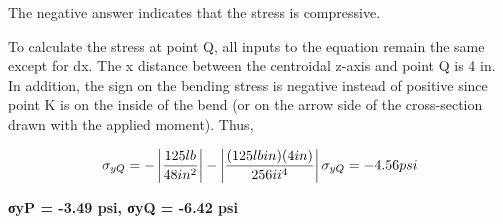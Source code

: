 \documentclass[
  letterpaper,
  DIV=11,
  numbers=noendperiod]{scrreprt}
\begin{document}
\begin{tcolorbox}
\begin{tcolorbox}
The negative answer indicates that the stress is compressive.

To calculate the stress at point Q, all inputs to the equation remain
the same except for dx. The x distance between the centroidal z-axis and
point Q is 4 in. In addition, the sign on the bending stress is negative
instead of positive since point K is on the inside of the bend (or on
the arrow side of the cross-section drawn with the applied moment).
Thus,

\[
\sigma_{y Q}=-\left|\frac{125 l b}{48 i n^2}\right|-\left|\frac{(125 l b i n)(4 i n)}{256 i i^4}\right| \\
\sigma_{y Q}=-4.56 p s i
\]

\textbf{σyP = -3.49 psi, σyQ = -6.42 psi}

\end{tcolorbox}

\end{tcolorbox}
\end{document}
